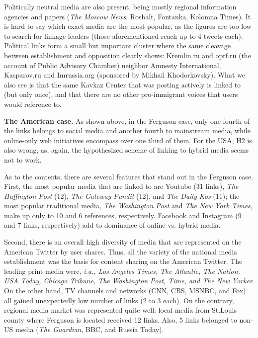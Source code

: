 Politically neutral media are also present, being mostly regional information agencies and papers (\textit{The Moscow News}, Rosbalt, Fontanka, Kolomna Times). It is hard to say which exact media are the most popular, as the figures are too low to search for linkage leaders (those aforementioned reach up to 4 tweets each). Political links form a small but important cluster where the same cleavage between establishment and opposition clearly shows: Kremlin.ru and oprf.ru (the account of Public Advisory Chamber) neighbor Amnesty International, Kasparov.ru and Imrussia.org (sponsored by Mikhail Khodorkovsky). What we also see is that the same Kavkaz Center that was posting actively is linked to (but only once), and that there are no other pro-immigrant voices that users would reference to.

\textbf{The American case.} As shown above, in the Ferguson case, only one fourth of the links belongs to social media and another fourth to mainstream media, while online-only web initiatives encompass over one third of them. For the USA, H2 is also wrong, as, again, the hypothesized scheme of linking to hybrid media seems not to work.

As to the contents, there are several features that stand out in the Ferguson case. First, the most popular media that are linked to are Youtube (31 links), \textit{The Huffington Post} (12), \textit{The Gateway Pundit} (12), and \textit{The Daily Kos} (11); the most popular traditional media, \textit{The Washington Post} and \textit{The New York Times}, make up only to 10 and 6 references, respectively. Facebook and Instagram (9 and 7 links, respectively) add to dominance of online vs. hybrid media.

Second, there is an overall high diversity of media that are represented on the American Twitter by user shares. Thus, all the variety of the national media establishment was the basis for content sharing on the American Twitter. The leading print media were, \textit{i.a., Los Angeles Times, The Atlantic, The Nation, USA Today, Chicago Tribune, The Washington Post, Time, and The New Yorker}. On the other hand, TV channels and networks (CNN, CBS, MSNBC, and Fox) all gained unexpectedly low number of links (2 to 3 each). On the contrary, regional media market was represented quite well: local media from St.Louis county where Ferguson is located received 12 links. Also, 5 links belonged to non-US media (\textit{The Guardian}, BBC, and Russia Today).

